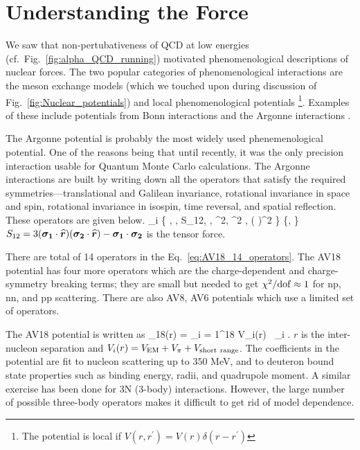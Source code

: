 	\section{Understanding the Force}
	\label{sec:recent_advances}

	We saw that non-pertubativeness of QCD at low energies
	(cf.~Fig.~\ref{fig:alpha_QCD_running}) motivated phenomenological
	descriptions of nuclear forces.  The two popular categories of
	phenomenological interactions are the meson exchange models (which we
	touched upon during discussion of Fig.~\ref{fig:Nuclear_potentials}) and
	local phenomenological potentials \footnote{The potential is local if
	$V(r, r^\prime) = V(r) \delta(r - r^\prime)$}.
	Examples of these include potentials
	from Bonn interactions \cite{Machleidt:1989tm, Machleidt:1987hj,
	Machleidt:2000ge} and the Argonne interactions \cite{Wiringa:1994wb}.

	The Argonne potential is probably the most widely used phenemenological
	potential.  One of the reasons being that until recently, it was the only
	precision interaction usable for Quantum Monte Carlo calculations.  The
	Argonne interactions are built by writing down all the operators that
	satisfy the required symmetries---translational and Galilean invariance,
	rotational invariance in space and spin, rotational invariance in isospin,
	time reversal, and spatial reflection.  These operators are given below.
	\beq
	_i \in \{ ,  \cdot {},
	S_{12},  \cdot {}, ^2, ^2  \cdot
	, ( \cdot {})^2 \} \otimes
	\{,  \cdot {}\}
	\label{eq:AV18_14_operators}
	\eeq
	$S_{12} = 3 (\bm{\sigma_1} \cdot \widehat{\bm{r}})
	(\bm{\sigma_2} \cdot \widehat{\bm{r}}) - \bm{\sigma_1} \cdot \bm{\sigma_2}$
	is the tensor force.

	There are total of 14 operators in the Eq.~\eqref{eq:AV18_14_operators}.
	The AV18 potential has four more operators which are the charge-dependent
	and charge-symmetry breaking terms; they are small but needed to get
	$\chi^2/{\rm{dof}} \approx 1$ for np, nn, and pp scattering.  There are
	also AV8, AV6 potentials which use a limited set of operators.

	The AV18 potential is written as
	\beq
	_{18}(r) = \sum_{i = 1}^{18} V_i(r) \, _i \;.
	\eeq
	$r$ is the inter-nucleon separation and $V_i (r) = V_{{\rm{EM}}} + V_{\pi}
	+ V_{{\rm{short~range}}}$.  The coefficients in the potential are fit to
	nucleon scattering up to $350$ MeV, and to deuteron bound state properties
	such as binding energy, radii, and quadrupole moment.
	A similar exercise has been done for 3N (3-body) interactions.  However,
	the large number of possible three-body operators makes it difficult to
	get rid of model dependence.

